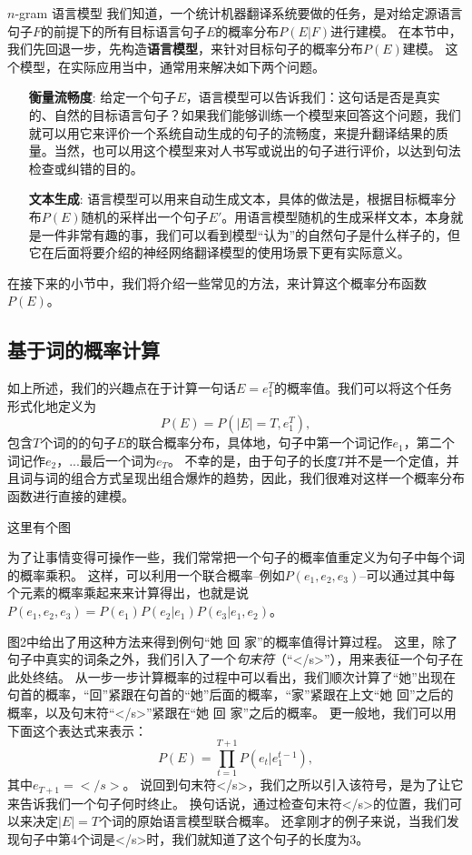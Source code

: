 \documentclass[10pt,a4paper]{ctexart}
\makeatletter
\renewcommand{\section}{\@startsection{section}{1}{0mm}
  {-\baselineskip}{0.5\baselineskip}{\bf\leftline}}
\makeatother
\begin{document}
\section{$n$-gram 语言模型}
我们知道，一个统计机器翻译系统要做的任务，是对给定源语言句子$F$的前提下的所有目标语言句子$E$的概率分布$P(E | F)$进行建模。
在本节中，我们先回退一步，先构造\textbf{语言模型}，来针对目标句子的概率分布$P(E)$建模。
这个模型，在实际应用当中，通常用来解决如下两个问题。
\begin{enumerate}
\item[\textbf{衡量流畅度}:] 给定一个句子$E$，语言模型可以告诉我们：这句话是否是真实的、自然的目标语言句子？如果我们能够训练一个模型来回答这个问题，我们就可以用它来评价一个系统自动生成的句子的流畅度，来提升翻译结果的质量。当然，也可以用这个模型来对人书写或说出的句子进行评价，以达到句法检查或纠错的目的。
\item[\textbf{文本生成}:] 语言模型可以用来自动生成文本，具体的做法是，根据目标概率分布$P(E)$随机的采样出一个句子$E'$。用语言模型随机的生成采样文本，本身就是一件非常有趣的事，我们可以看到模型“认为”的自然句子是什么样子的，但它在后面将要介绍的神经网络翻译模型的使用场景下更有实际意义。
\end{enumerate}
在接下来的小节中，我们将介绍一些常见的方法，来计算这个概率分布函数$P(E)$。

\subsection{基于词的概率计算}
如上所述，我们的兴趣点在于计算一句话$E=e_1^T$的概率值。我们可以将这个任务形式化地定义为
\[
  P(E) = P(|E| = T,e_1^T),
\]
包含$T$个词的的句子$E$的联合概率分布，具体地，句子中第一个词记作$e_1$，第二个词记作$e_2$，...最后一个词为$e_T$。
不幸的是，由于句子的长度$T$并不是一个定值，并且词与词的组合方式呈现出组合爆炸的趋势，因此，我们很难对这样一个概率分布函数进行直接的建模。

这里有个图

为了让事情变得可操作一些，我们常常把一个句子的概率值重定义为句子中每个词的概率乘积。
这样，可以利用一个联合概率--例如$P(e_1,e_2,e_3)$--可以通过其中每个元素的概率乘起来来计算得出，也就是说$P(e_1,e_2,e_3)=P(e_1)P(e_2|e_1)P(e_3|e_1,e_2)$。

图2中给出了用这种方法来得到例句“她 回 家”的概率值得计算过程。
这里，除了句子中真实的词条之外，我们引入了一个\textit{句末符}（“</s>”），用来表征一个句子在此处终结。
从一步一步计算概率的过程中可以看出，我们顺次计算了“她”出现在句首的概率，“回”紧跟在句首的“她”后面的概率，“家”紧跟在上文“她 回”之后的概率，以及句末符“</s>”紧跟在“她 回 家”之后的概率。
更一般地，我们可以用下面这个表达式来表示：
\[
 P(E) = \prod_{t=1}^{T+1} P(e_t|e_1^{t-1}),
\]
其中$e_{T+1}=</s>$。
说回到句末符</s>，我们之所以引入该符号，是为了让它来告诉我们一个句子何时终止。
换句话说，通过检查句末符</s>的位置，我们可以来决定$|E|=T$个词的原始语言模型联合概率。
还拿刚才的例子来说，当我们发现句子中第4个词是</s>时，我们就知道了这个句子的长度为3。
\end{document}
